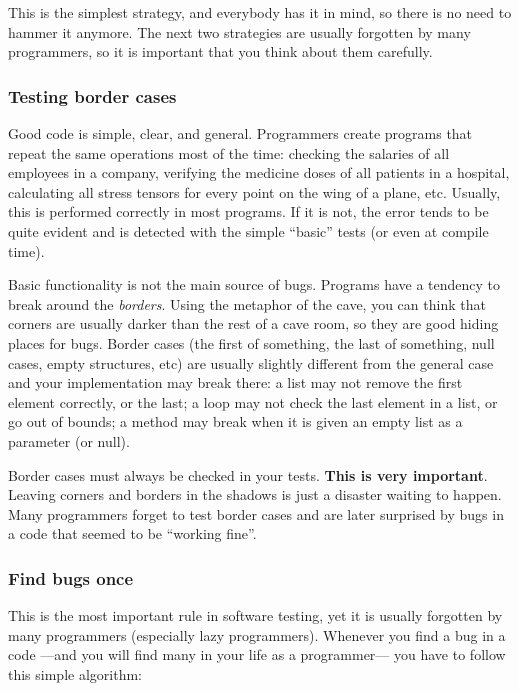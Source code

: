 This is the simplest strategy, and everybody has it in mind, so there
is no need to hammer it anymore. The next two strategies are usually
forgotten by many programmers, so it is important that you think about
them carefully. 

\subsubsection{Testing border cases}
\label{sec:testing-border-cases}

Good code is simple, clear, and general. Programmers create programs
that repeat the same operations most of the time: checking the
salaries of all employees in a company, verifying the medicine doses
of all patients in a hospital, calculating all stress tensors for
every point on the wing of a plane, etc. Usually, this is performed
correctly in most programs. If it is not, the error tends to be quite
evident and is detected with the simple
``basic'' tests (or even at compile time).

Basic functionality is not the main source of bugs. 
Programs have a tendency to break around the \emph{borders}. Using the
metaphor of the cave, you can think that corners are usually darker
than the rest of a cave room, so they are good hiding places for
bugs. Border cases (the first of something, the last of something, null
cases, empty structures, etc) are usually slightly
different from the general case and your implementation may break
there: a list may not remove the first element correctly, or the
last; a loop may not check the last element in a list, or go out of
bounds; a method may break when it is given an empty list as a
parameter (or null). 

Border cases must always be checked in your tests. \textbf{This is very
important}. Leaving corners and borders in the shadows is just a
disaster waiting to happen. Many programmers forget to test border
cases and are later surprised by bugs in a code that seemed to be
``working fine''.

\subsubsection{Find bugs once}
\label{sec:find-bugs-once}

This is the most important rule in software testing, yet it is usually
forgotten by many programmers (especially lazy programmers). Whenever
you find a bug in a code ---and you will find many in your life as a
programmer--- you have to follow this simple algorithm: 

